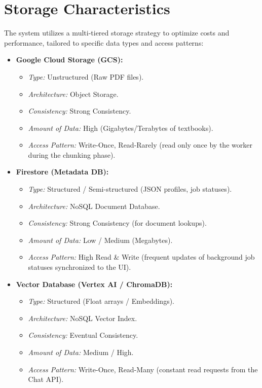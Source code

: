 \documentclass[12pt,a4paper]{article}
\begin{document}
\section{Storage Characteristics}
The system utilizes a multi-tiered storage strategy to optimize costs and performance, tailored to specific data types and access patterns:
\begin{itemize}[label=\textbullet]
    \item \textbf{Google Cloud Storage (GCS):}
    \begin{itemize}
        \item \textit{Type:} Unstructured (Raw PDF files).
        \item \textit{Architecture:} Object Storage.
        \item \textit{Consistency:} Strong Consistency.
        \item \textit{Amount of Data:} High (Gigabytes/Terabytes of textbooks).
        \item \textit{Access Pattern:} Write-Once, Read-Rarely (read only once by the worker during the chunking phase).
    \end{itemize}
    \item \textbf{Firestore (Metadata DB):}
    \begin{itemize}
        \item \textit{Type:} Structured / Semi-structured (JSON profiles, job statuses).
        \item \textit{Architecture:} NoSQL Document Database.
        \item \textit{Consistency:} Strong Consistency (for document lookups).
        \item \textit{Amount of Data:} Low / Medium (Megabytes).
        \item \textit{Access Pattern:} High Read \& Write (frequent updates of background job statuses synchronized to the UI).
    \end{itemize}
    \item \textbf{Vector Database (Vertex AI / ChromaDB):}
    \begin{itemize}
        \item \textit{Type:} Structured (Float arrays / Embeddings).
        \item \textit{Architecture:} NoSQL Vector Index.
        \item \textit{Consistency:} Eventual Consistency.
        \item \textit{Amount of Data:} Medium / High.
        \item \textit{Access Pattern:} Write-Once, Read-Many (constant read requests from the Chat API).
    \end{itemize}
\end{itemize}
\end{document}

